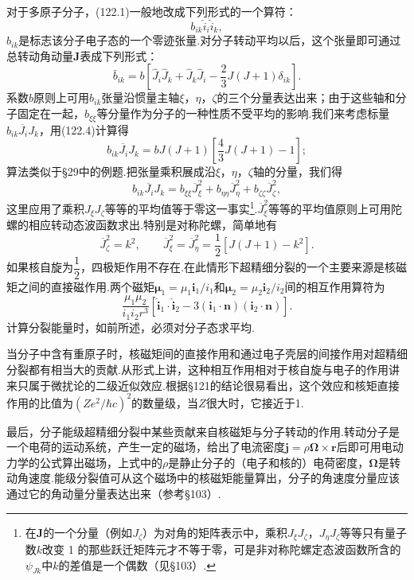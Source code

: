 对于多原子分子，(122.1)一般地改成下列形式的一个算符：
\begin{equation}
  b_{ik}\hat{i}_i\hat{i}_k,
\end{equation}
$b_{ik}$是标志该分子电子态的一个零迹张量.对分子转动平均以后，这个张量即可通过总转动角动量$\boldsymbol{J}$表成下列形式：
\begin{equation}
  \bar{b}_{ik}=b\left[\hat{J}_i\hat{J}_k+\hat{J}_k\hat{J}_i
  -\frac{2}{3}J(J+1)\delta_{ik}\right].
\end{equation}
系数$b$原则上可用$b_{ik}$张量沿惯量主轴$\xi$，$\eta$，$\zeta$的三个分量表达出来；由于这些轴和分子固定在一起，$b_{\xi\xi}$等分量作为分子的一种性质不受平均的影响.我们来考虑标量$\overline{b_{ik}J_iJ_k}$，用(122.4)计算得
\begin{equation}
  \overline{b_{ik}J_iJ_k}=bJ(J+1)\left[\frac{4}{3}J(J+1)-1\right];
\end{equation}
算法类似于§29中的例题.把张量乘积展成沿$\xi$，$\eta$，$\zeta$轴的分量，我们得
\begin{equation}
  \overline{b_{ik}J_iJ_k}
  =b_{\xi\xi}\overline{J}_\xi^2+b_{\eta\eta}\overline{J}_\eta^2
  +b_{\zeta\zeta}\overline{J}_\zeta^2,
\end{equation}
这里应用了乘积$J_\xi J_\zeta$等等的平均值等于零这一事实\footnote{在$\boldsymbol{J}$的一个分量（例如$J_\zeta$）为对角的矩阵表示中，乘积$J_\xi J_\zeta$，$J_\eta J_\zeta$等等只有量子数$k$改变 1 的那些跃迁矩阵元才不等于零，可是非对称陀螺定态波函数所含的$\psi_{Jk}$中$k$的差值是一个偶数（见§103）.}.$\overline{J}_\xi^2$等等的平均值原则上可用陀螺的相应转动态波函数求出.特别是对称陀螺，简单地有
\begin{equation*}
  \overline{J}_\zeta^2=k^2,\qquad
  \overline{J}_\xi^2=\overline{J}_\eta^2
  =\frac{1}{2}\left[J(J+1)-k^2\right].
\end{equation*}
如果核自旋为$\dfrac{1}{2}$，四极矩作用不存在.在此情形下超精细分裂的一个主要来源是核磁矩之间的直接磁作用.两个磁矩$\boldsymbol{\mu}_1=\mu_1\boldsymbol{i}_1/i_1$和$\boldsymbol{\mu}_2=\mu_2\boldsymbol{i}_2/i_2$间的相互作用算符为
\begin{equation*}
  \frac{\mu_1\mu_2}{i_1i_2r^3}
  \left[\hat{\boldsymbol{i}}_1\cdot\hat{\boldsymbol{i}}_2
  -3(\boldsymbol{i}_1\cdot\boldsymbol{n})(\boldsymbol{i}_2\cdot\boldsymbol{n})\right].
\end{equation*}
计算分裂能量时，如前所述，必须对分子态求平均.

当分子中含有重原子时，核磁矩间的直接作用和通过电子壳层的间接作用对超精细分裂都有相当大的贡献.从形式上讲，这种相互作用相对于核自旋与电子的作用讲来只属于微扰论的二级近似效应.根据§121的结论很易看出，这个效应和核矩直接作用的比值为$\left(Ze^2/\hbar c\right)^2$的数量级，当$Z$很大时，它接近于1.

最后，分子能级超精细分裂中某些贡献来自核磁矩与分子转动的作用.转动分子是一个电荷的运动系统，产生一定的磁场，给出了电流密度$\boldsymbol{j}=\rho\boldsymbol{\Omega}\times\boldsymbol{r}$后即可用电动力学的公式算出磁场，上式中的$\rho$是静止分子的（电子和核的）电荷密度，$\boldsymbol{\Omega}$是转动角速度.能级分裂值可从这个磁场中的核磁矩能量算出，分子的角速度分量应该通过它的角动量分量表达出来（参考§103）.

